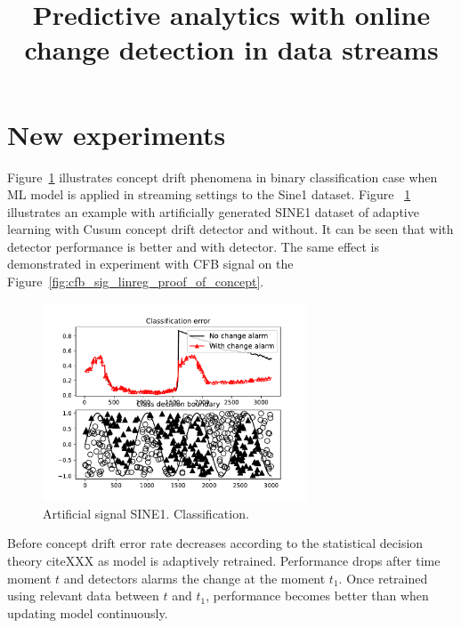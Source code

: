 \documentclass[12 pt]{article}
\title{Predictive analytics with online change detection in data streams}
\date{}
\begin{document}
	\maketitle
  \section{New experiments}
  Figure~\ref{fig:sine1_example} illustrates concept drift phenomena in binary classification case when ML model is applied in streaming settings to the Sine1 dataset. 
  Figure ~\ref{fig:sine1_example} illustrates an example with artificially generated SINE1 dataset of adaptive learning with Cusum concept drift detector and without. 
  It can be seen that with detector performance is better and with detector.
  The same effect is demonstrated in experiment with CFB signal on the Figure~\ref{fig:cfb_sig_linreg_proof_of_concept}.
  \begin{figure}[!htb]
    \centering
    \includegraphics[width=0.7\textwidth]{images/proof_of_concept_dt_sine1}
    \caption{Artificial signal SINE1. Classification.}\label{fig:sine1_example}
  \end{figure}
  Before concept drift error rate decreases according to the statistical decision theory cite{XXX} as model is adaptively retrained. 
  Performance drops after time moment $t$ and detectors alarms the change at the moment $t_1$. 
  Once retrained using relevant data between $t$ and $t_1$, performance becomes better than when updating model continuously.
\end{document}
